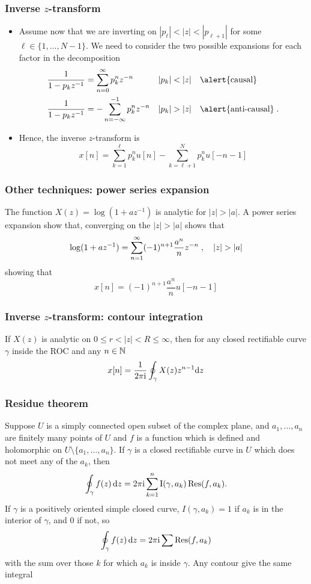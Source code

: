 \begin{frame}
\frametitle{Inverse $z$-transform}
\begin{itemize}
\item Assume now that we are inverting on  $|p_{\ell}| < |z| < |p_{\ell+1}|$ for some $\ell \in \{1, \dots, N-1\}$. 
We need to consider the two possible expansions for each factor in the decomposition
\begin{align*}
&\frac{1}{1-p_k z^{-1}} = \sum_{n=0}^\infty p_k^{n} z^{-n} && |p_k| < |z| \quad \text{\alert{causal}} \\
&\frac{1}{1-p_k z^{-1}} = - \sum_{n=-\infty}^{-1} p_k^n z^{-n} && |p_k| > |z| \quad \text{\alert{anti-causal}} \text\eqsp.
\end{align*}  
\item Hence, the inverse $z$-transform is
\[
x[n] = \sum_{k=1}^\ell p_k^n u[n] - \sum_{k=\ell+1}^N p_k^n u[-n-1]
\]
\end{itemize}
\end{frame}

 
\begin{frame}
\frametitle{Other techniques: power series expansion}
The function $X(z)= \log(1 + a z^{-1})$  is analytic for $|z| > |a|$. A power series expansion show that, converging on the $|z| > |a|$ shows that
\[
\log(1 + az ^{-1}) = \sum_{n=1}^\infty (-1)^{n+1} \frac{a^n}{n} z^{-n} \;, \quad |z| > |a|
\]
showing that 
\[
x[n]= (-1)^{n+1} \frac{a^n}{n} u[-n-1] 
\]

\end{frame}

\begin{frame}
\frametitle{Inverse $z$-transform: contour integration}
\begin{theorem}
If $X(z)$ is analytic on $0 \leq r < |z| < R \leq \infty$, then for any   closed rectifiable curve $\gamma$ inside the ROC and any $n \in \mathbb{N}$
\[
x[n]= \frac{1}{2 \pi \mathrm{i}} \oint_{\gamma} X(z) z^{n-1} \mathrm{d} z
\]
\end{theorem}
\end{frame}


\begin{frame}
\frametitle{Residue theorem}
Suppose $U$ is a simply connected open subset of the complex plane, and $a_1,\dots,a_n$ are finitely many points of $U$ and $f$ is a function which is defined and holomorphic on $U \setminus \{a_1,\dots,a_n\}$. If $\gamma$ is a closed rectifiable curve in $U$ which does not meet any of the $a_k$,
then
\[
\oint_\gamma f(z)\, \mathrm{d} z =
2\pi \mathrm{i} \sum_{k=1}^n \operatorname{I}(\gamma, a_k) \operatorname{Res}( f, a_k ).
\] 
If $\gamma$ is a positively oriented simple closed curve, $I(\gamma, a_k) = 1$ if $a_k$ is in the interior of $\gamma$, and $0$ if not, so
\[
\oint_\gamma f(z)\, \mathrm{d} z =
2 \pi \mathrm{i} \sum \operatorname{Res}( f, a_k )
\]
with the sum over those $k$ for which $a_k$ is inside $\gamma$. 
\alert{Any contour give the same integral}
\end{frame}



